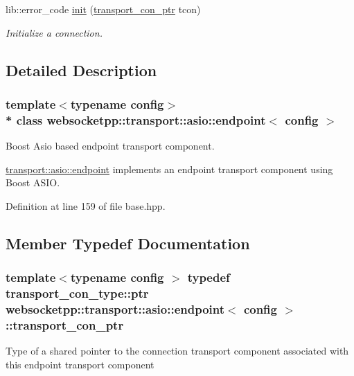 \begin{DoxyCompactItemize}
\item 
lib\+::error\+\_\+code \hyperlink{classwebsocketpp_1_1transport_1_1asio_1_1endpoint_a756059ab3ecd99d7c2a845b40729c7c8}{init} (\hyperlink{classwebsocketpp_1_1transport_1_1asio_1_1endpoint_ac5fc306f32d15f92dd1b22366eaba62d}{transport\+\_\+con\+\_\+ptr} tcon)
\begin{DoxyCompactList}\small\item\em Initialize a connection. \end{DoxyCompactList}\end{DoxyCompactItemize}


\subsection{Detailed Description}
\subsubsection*{template$<$typename config$>$\\*
class websocketpp\+::transport\+::asio\+::endpoint$<$ config $>$}

Boost Asio based endpoint transport component. 

\hyperlink{classwebsocketpp_1_1transport_1_1asio_1_1endpoint}{transport\+::asio\+::endpoint} implements an endpoint transport component using Boost A\+S\+IO. 

Definition at line 159 of file base.\+hpp.



\subsection{Member Typedef Documentation}
\subsubsection[{\texorpdfstring{transport\+\_\+con\+\_\+ptr}{transport\_con\_ptr}}]{\setlength{\rightskip}{0pt plus 5cm}template$<$typename config $>$ typedef {\bf transport\+\_\+con\+\_\+type\+::ptr} {\bf websocketpp\+::transport\+::asio\+::endpoint}$<$ {\bf config} $>$\+::{\bf transport\+\_\+con\+\_\+ptr}}\hypertarget{classwebsocketpp_1_1transport_1_1asio_1_1endpoint_ac5fc306f32d15f92dd1b22366eaba62d}{}\label{classwebsocketpp_1_1transport_1_1asio_1_1endpoint_ac5fc306f32d15f92dd1b22366eaba62d}
Type of a shared pointer to the connection transport component associated with this endpoint transport component 

